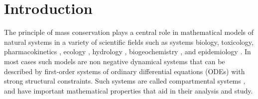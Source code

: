 %


%
%
%
%


\section{Introduction}
The principle of mass conservation plays a central role in mathematical models
of natural systems in a variety of scientific fields such as systems biology,
toxicology, pharmacokinetics \citep{Anderson1983}, ecology
\citep{Eriksson1971ARoEaS, Rodhe1979Tellus, Matis1979, Manzoni2009SBB},
hydrology \citep{Nash1957IASH, Botter2011GRL, Harman2014GRL}, biogeochemistry
\citep{Manzoni2009SBB, Sierra2015EM}, and epidemiology \citep{Jacquez1993SIAM}.
In most cases such models are non negative dynamical systems that can be
described by first-order systems of ordinary differential equations (ODEs) with
strong structural constraints.  Such systems are called compartmental systems
\citep{Anderson1983, Jacquez1993SIAM, Walter1999, Haddad2010}, and have
important mathematical properties that aid in their analysis and study.

